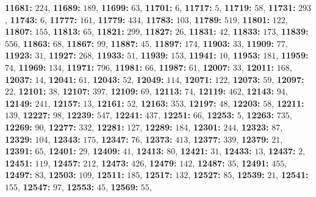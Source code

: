 \textsf{\bfseries 11681:} $224$, \textsf{\bfseries 11689:} $189$, \textsf{\bfseries 11699:} $63$, \textsf{\bfseries 11701:} $6$, \textsf{\bfseries 11717:} $5$, \textsf{\bfseries 11719:} $58$, \textsf{\bfseries 11731:} $293$, \textsf{\bfseries 11743:} $6$, \textsf{\bfseries 11777:} $161$, \textsf{\bfseries 11779:} $434$, \textsf{\bfseries 11783:} $103$, \textsf{\bfseries 11789:} $519$, \textsf{\bfseries 11801:} $122$, \textsf{\bfseries 11807:} $155$, \textsf{\bfseries 11813:} $65$, \textsf{\bfseries 11821:} $299$, \textsf{\bfseries 11827:} $26$, \textsf{\bfseries 11831:} $42$, \textsf{\bfseries 11833:} $173$, \textsf{\bfseries 11839:} $556$, \textsf{\bfseries 11863:} $68$, \textsf{\bfseries 11867:} $99$, \textsf{\bfseries 11887:} $45$, \textsf{\bfseries 11897:} $174$, \textsf{\bfseries 11903:} $33$, \textsf{\bfseries 11909:} $77$, \textsf{\bfseries 11923:} $31$, \textsf{\bfseries 11927:} $268$, \textsf{\bfseries 11933:} $51$, \textsf{\bfseries 11939:} $153$, \textsf{\bfseries 11941:} $10$, \textsf{\bfseries 11953:} $181$, \textsf{\bfseries 11959:} $74$, \textsf{\bfseries 11969:} $134$, \textsf{\bfseries 11971:} $796$, \textsf{\bfseries 11981:} $66$, \textsf{\bfseries 11987:} $61$, \textsf{\bfseries 12007:} $33$, \textsf{\bfseries 12011:} $168$, \textsf{\bfseries 12037:} $14$, \textsf{\bfseries 12041:} $61$, \textsf{\bfseries 12043:} $52$, \textsf{\bfseries 12049:} $114$, \textsf{\bfseries 12071:} $122$, \textsf{\bfseries 12073:} $59$, \textsf{\bfseries 12097:} $22$, \textsf{\bfseries 12101:} $38$, \textsf{\bfseries 12107:} $397$, \textsf{\bfseries 12109:} $69$, \textsf{\bfseries 12113:} $74$, \textsf{\bfseries 12119:} $462$, \textsf{\bfseries 12143:} $94$, \textsf{\bfseries 12149:} $241$, \textsf{\bfseries 12157:} $13$, \textsf{\bfseries 12161:} $52$, \textsf{\bfseries 12163:} $353$, \textsf{\bfseries 12197:} $48$, \textsf{\bfseries 12203:} $58$, \textsf{\bfseries 12211:} $139$, \textsf{\bfseries 12227:} $98$, \textsf{\bfseries 12239:} $547$, \textsf{\bfseries 12241:} $437$, \textsf{\bfseries 12251:} $66$, \textsf{\bfseries 12253:} $5$, \textsf{\bfseries 12263:} $735$, \textsf{\bfseries 12269:} $90$, \textsf{\bfseries 12277:} $332$, \textsf{\bfseries 12281:} $127$, \textsf{\bfseries 12289:} $184$, \textsf{\bfseries 12301:} $244$, \textsf{\bfseries 12323:} $87$, \textsf{\bfseries 12329:} $104$, \textsf{\bfseries 12343:} $175$, \textsf{\bfseries 12347:} $76$, \textsf{\bfseries 12373:} $413$, \textsf{\bfseries 12377:} $339$, \textsf{\bfseries 12379:} $21$, \textsf{\bfseries 12391:} $65$, \textsf{\bfseries 12401:} $29$, \textsf{\bfseries 12409:} $41$, \textsf{\bfseries 12413:} $80$, \textsf{\bfseries 12421:} $31$, \textsf{\bfseries 12433:} $13$, \textsf{\bfseries 12437:} $2$, \textsf{\bfseries 12451:} $119$, \textsf{\bfseries 12457:} $212$, \textsf{\bfseries 12473:} $426$, \textsf{\bfseries 12479:} $142$, \textsf{\bfseries 12487:} $35$, \textsf{\bfseries 12491:} $455$, \textsf{\bfseries 12497:} $83$, \textsf{\bfseries 12503:} $109$, \textsf{\bfseries 12511:} $185$, \textsf{\bfseries 12517:} $132$, \textsf{\bfseries 12527:} $85$, \textsf{\bfseries 12539:} $21$, \textsf{\bfseries 12541:} $155$, \textsf{\bfseries 12547:} $97$, \textsf{\bfseries 12553:} $45$, \textsf{\bfseries 12569:} $55$, 
